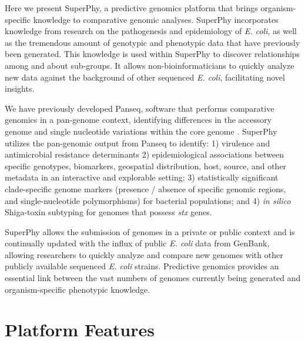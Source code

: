 \documentclass[doublespacing, linenumbers]{bmcart}
\begin{document}
Here we present SuperPhy, a predictive genomics platform that brings organism-specific knowledge to comparative genomic analyses. SuperPhy incorporates knowledge from research on the pathogenesis and epidemiology of \textit{E. coli}, as well as the tremendous amount of genotypic and phenotypic data that have previously been generated. This knowledge is used within SuperPhy to discover relationships among and about sub-groups. It allows non-bioinformaticians to quickly analyze new data against the background of other sequenced \textit{E. coli}, facilitating novel insights.

We have previously developed Panseq, software that performs comparative genomics in a  pan-genome context,  identifying differences in the accessory genome and single nucleotide variations within the core genome \cite{laing_pan-genome_2010}. SuperPhy utilizes the pan-genomic output from Panseq to identify: 1) virulence and antimicrobial resistance determinants 2) epidemiological associations between specific genotypes, biomarkers, geospatial distribution, host, source, and other metadata in an interactive and explorable setting; 3) statistically significant clade-specific genome markers (presence / absence of specific genomic regions, and single-nucleotide polymorphisms) for bacterial populations; and 4) \textit{in silico} Shiga-toxin subtyping for genomes that possess \textit{stx} genes.

SuperPhy allows the submission of genomes in a private or public context and is continually updated with the influx of public \textit{E. coli} data from GenBank, allowing researchers to quickly analyze and compare new genomes with other publicly available sequenced \textit{E. coli} strains. Predictive genomics provides an essential link between the vast numbers of genomes currently being generated and organism-specific phenotypic knowledge.

\section{Platform Features}
\end{document}
